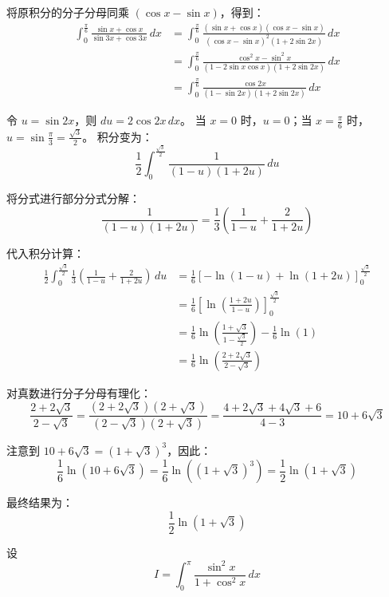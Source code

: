 \begin{questions}
\begin{solution}
将原积分的分子分母同乘 $(\cos x - \sin x)$，得到：
\begin{align*}
\int_0^{\frac{\pi}{6}} \frac{\sin x + \cos x}{\sin 3x + \cos 3x} \,dx &= \int_0^{\frac{\pi}{6}} \frac{(\sin x + \cos x)(\cos x - \sin x)}{(\cos x - \sin x)^2 (1 + 2\sin 2x)} \,dx \\
&= \int_0^{\frac{\pi}{6}} \frac{\cos^2 x - \sin^2 x}{(1 - 2\sin x \cos x)(1 + 2\sin 2x)} \,dx \\
&= \int_0^{\frac{\pi}{6}} \frac{\cos 2x}{(1 - \sin 2x)(1 + 2\sin 2x)} \,dx
\end{align*}

令 $u = \sin 2x$，则 $du = 2\cos 2x \,dx$。
当 $x = 0$ 时，$u = 0$；当 $x = \frac{\pi}{6}$ 时，$u = \sin\frac{\pi}{3} = \frac{\sqrt{3}}{2}$。
积分变为：
\[
\frac{1}{2} \int_0^{\frac{\sqrt{3}}{2}} \frac{1}{(1 - u)(1 + 2u)} \,du
\]

将分式进行部分分式分解：
\[
\frac{1}{(1 - u)(1 + 2u)} = \frac{1}{3} \left( \frac{1}{1 - u} + \frac{2}{1 + 2u} \right)
\]

代入积分计算：
\begin{align*}
\frac{1}{2} \int_0^{\frac{\sqrt{3}}{2}} \frac{1}{3} \left( \frac{1}{1 - u} + \frac{2}{1 + 2u} \right) \,du &= \frac{1}{6} \left[ -\ln(1 - u) + \ln(1 + 2u) \right]_0^{\frac{\sqrt{3}}{2}} \\
&= \frac{1}{6} \left[ \ln \left( \frac{1 + 2u}{1 - u} \right) \right]_0^{\frac{\sqrt{3}}{2}} \\
&= \frac{1}{6} \ln \left( \frac{1 + \sqrt{3}}{1 - \frac{\sqrt{3}}{2}} \right) - \frac{1}{6} \ln(1) \\
&= \frac{1}{6} \ln \left( \frac{2 + 2\sqrt{3}}{2 - \sqrt{3}} \right)
\end{align*}

对真数进行分子分母有理化：
\[
\frac{2 + 2\sqrt{3}}{2 - \sqrt{3}} = \frac{(2 + 2\sqrt{3})(2 + \sqrt{3})}{(2 - \sqrt{3})(2 + \sqrt{3})} = \frac{4 + 2\sqrt{3} + 4\sqrt{3} + 6}{4 - 3} = 10 + 6\sqrt{3}
\]

注意到 $10 + 6\sqrt{3} = (1 + \sqrt{3})^3$，因此：
\[
\frac{1}{6} \ln(10 + 6\sqrt{3}) = \frac{1}{6} \ln \left( (1 + \sqrt{3})^3 \right) = \frac{1}{2} \ln(1 + \sqrt{3})
\]

最终结果为：
\[
\frac{1}{2} \ln(1 + \sqrt{3})
\]
\end{solution}

    \question 设
    \[
    I = \int_{0}^{\pi} \frac{\sin^2 x}{1 + \cos^2 x} \,dx
    \]
    \begin{parts}

\end{parts}
\end{questions}
